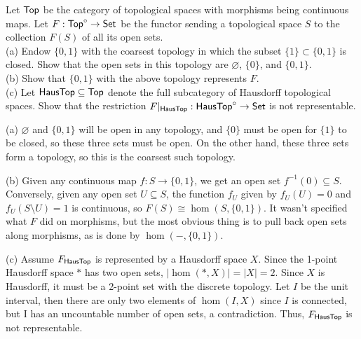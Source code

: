 \begin{exercise}[1.4]
  Let $\text{\sf Top}$ be the category of topological spaces with morphisms being continuous maps. Let $F:\text{\sf Top}^\circ\to\text{\sf Set}$ be the functor sending a topological space $S$ to the collection $F(S)$ of all its open sets.\\
  (a) Endow $\{0,1\}$ with the coarsest topology in which the subset $\{1\}\subset \{0,1\}$ is closed. Show that the open sets in this topology are $\varnothing$, $\{0\}$, and $\{0,1\}$.\\
  (b) Show that $\{0,1\}$ with the above topology represents $F$.\\
  (c) Let $\text{\sf HausTop}\subseteq \text{\sf Top}$ denote the full subcategory of Hausdorff topological spaces. Show that the restriction $F|_{\text{\sf HausTop}}:\text{\sf HausTop}^\circ\to \text{\sf Set}$ is not representable.
\end{exercise}
\begin{solution}
  (a) $\varnothing$ and $\{0,1\}$ will be open in any topology, and $\{0\}$ must be open for $\{1\}$ to be closed, so these three sets must be open. On the other hand, these three sets form a topology, so this is the coarsest such topology.

  (b) Given any continuous map $f:S\to \{0,1\}$, we get an open set $f^{-1}(0)\subseteq S$. Conversely, given any open set $U\subseteq S$, the function $f_U$ given by $f_U(U)=0$ and $f_U(S\setminus U)=1$ is continuous, so $F(S)\cong\hom(S,\{0,1\})$. It wasn't specified what $F$ did on morphisms, but the most obvious thing is to pull back open sets along morphisms, as is done by $\hom(-,\{0,1\})$.

  (c) Assume $F_{\text{\sf HausTop}}$ is represented by a Hausdorff space $X$. Since the 1-point Hausdorff space $\ast$ has two open sets, $|\hom(\ast,X)|=|X|=2$. Since $X$ is Hausdorff, it must be a 2-point set with the discrete topology. Let $I$ be the unit interval, then there are only two elements of $\hom(I,X)$ since $I$ is connected, but I has an uncountable number of open sets, a contradiction. Thus, $F_{\text{\sf HausTop}}$ is not representable.
\end{solution}

